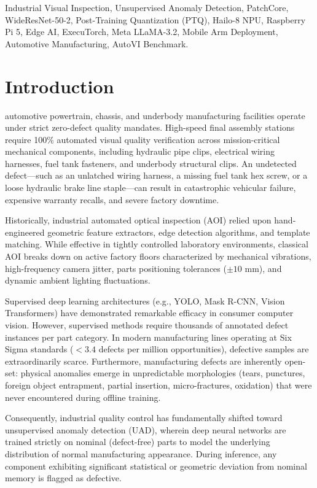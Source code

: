 \documentclass[journal,twocolumn]{IEEEtran}
\begin{document}
\begin{IEEEkeywords}
Industrial Visual Inspection, Unsupervised Anomaly Detection, PatchCore, WideResNet-50-2, Post-Training Quantization (PTQ), Hailo-8 NPU, Raspberry Pi 5, Edge AI, ExecuTorch, Meta LLaMA-3.2, Mobile Arm Deployment, Automotive Manufacturing, AutoVI Benchmark.
\end{IEEEkeywords}

\section{Introduction}
 automotive powertrain, chassis, and underbody manufacturing facilities operate under strict zero-defect quality mandates. High-speed final assembly stations require 100\% automated visual quality verification across mission-critical mechanical components, including hydraulic pipe clips, electrical wiring harnesses, fuel tank fasteners, and underbody structural clips. An undetected defect---such as an unlatched wiring harness, a missing fuel tank hex screw, or a loose hydraulic brake line staple---can result in catastrophic vehicular failure, expensive warranty recalls, and severe factory downtime.

Historically, industrial automated optical inspection (AOI) relied upon hand-engineered geometric feature extractors, edge detection algorithms, and template matching. While effective in tightly controlled laboratory environments, classical AOI breaks down on active factory floors characterized by mechanical vibrations, high-frequency camera jitter, parts positioning tolerances ($\pm 10$ mm), and dynamic ambient lighting fluctuations.

Supervised deep learning architectures (e.g., YOLO, Mask R-CNN, Vision Transformers) have demonstrated remarkable efficacy in consumer computer vision. However, supervised methods require thousands of annotated defect instances per part category. In modern manufacturing lines operating at Six Sigma standards ($<3.4$ defects per million opportunities), defective samples are extraordinarily scarce. Furthermore, manufacturing defects are inherently open-set: physical anomalies emerge in unpredictable morphologies (tears, punctures, foreign object entrapment, partial insertion, micro-fractures, oxidation) that were never encountered during offline training.

Consequently, industrial quality control has fundamentally shifted toward unsupervised anomaly detection (UAD), wherein deep neural networks are trained strictly on nominal (defect-free) parts to model the underlying distribution of normal manufacturing appearance. During inference, any component exhibiting significant statistical or geometric deviation from nominal memory is flagged as defective.
\end{document}

